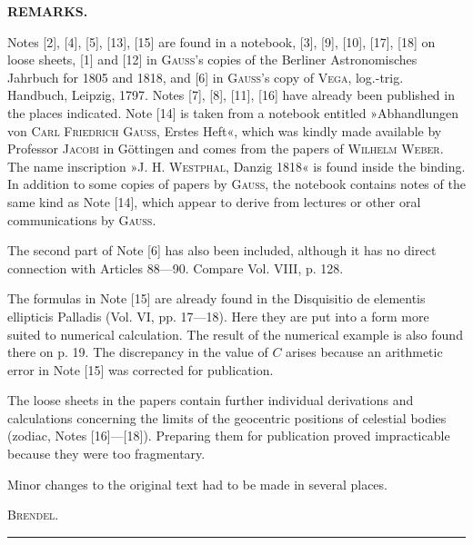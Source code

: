 \clearpage
{}
\begin{center}
\textbf{REMARKS.}
\end{center}

Notes [2], [4], [5], [13], [15] are found in a notebook, [3], [9], [10], [17], [18] on loose sheets, [1] and [12] in \textsc{Gauss}'s copies of the Berliner Astronomisches Jahrbuch for 1805 and 1818, and [6] in \textsc{Gauss}'s copy of \textsc{Vega}, log.-trig. Handbuch, Leipzig, 1797. Notes [7], [8], [11], [16] have already been published in the places indicated. Note [14] is taken from a notebook entitled »Abhandlungen von \textsc{Carl Friedrich Gauss}, Erstes Heft«, which was kindly made available by Professor \textsc{Jacobi} in Göttingen and comes from the papers of \textsc{Wilhelm Weber}. The name inscription »\textsc{J. H. Westphal}, Danzig 1818« is found inside the binding. In addition to some copies of papers by \textsc{Gauss}, the notebook contains notes of the same kind as Note [14], which appear to derive from lectures or other oral communications by \textsc{Gauss}.

The second part of Note [6] has also been included, although it has no direct connection with Articles 88---90. Compare Vol. VIII, p. 128.

The formulas in Note [15] are already found in the Disquisitio de elementis ellipticis Palladis (Vol. VI, pp. 17---18). Here they are put into a form more suited to numerical calculation. The result of the numerical example is also found there on p. 19. The discrepancy in the value of \(C\) arises because an arithmetic error in Note [15] was corrected for publication.

The loose sheets in the papers contain further individual derivations and calculations concerning the limits of the geocentric positions of celestial bodies (zodiac, Notes [16]---[18]). Preparing them for publication proved impracticable because they were too fragmentary.

Minor changes to the original text had to be made in several places.
\begin{flushright}
\textsc{Brendel}.
\end{flushright}
\begin{center}
\rule{0.3\linewidth}{0.4pt}
\end{center}
